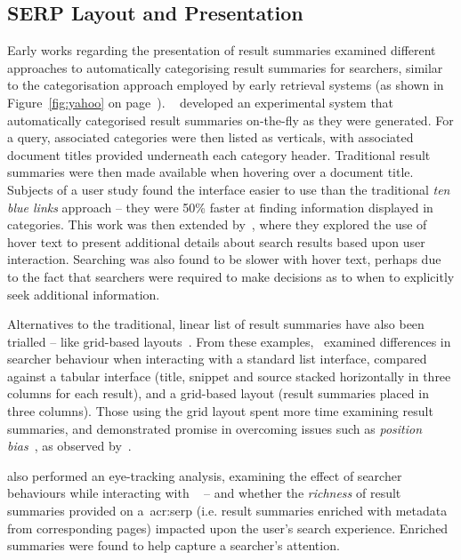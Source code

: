 \subsection{SERP Layout and Presentation}
Early works regarding the presentation of result summaries examined different approaches to automatically categorising result summaries for searchers, similar to the categorisation approach employed by early retrieval systems (as shown in Figure~\ref{fig:yahoo} on page~\pageref{fig:yahoo}). ~\cite{chen2000order_to_web} developed an experimental system that automatically categorised result summaries on-the-fly as they were generated. For a query, associated categories were then listed as verticals, with associated document titles provided underneath each category header. Traditional result summaries were then made available when hovering over a document title. Subjects of a user study found the interface easier to use than the traditional \emph{ten blue links} approach -- they were 50\% faster at finding information displayed in categories. This work was then extended by~\cite{dumais2001results_in_context}, where they explored the use of hover text to present additional details about search results based upon user interaction. Searching was also found to be slower with hover text, perhaps due to the fact that searchers were required to make decisions as to when to explicitly seek additional information.

Alternatives to the traditional, linear list of result summaries have also been trialled -- like grid-based layouts~\citep{resnick2001modeling, kammerer2010interface, chierichetti2011two_dimensional_presentation}. From these examples,~\cite{kammerer2010interface} examined differences in searcher behaviour when interacting with a standard list interface, compared against a tabular interface (title, snippet and source stacked horizontally in three columns for each result), and a grid-based layout (result summaries placed in three columns). Those using the grid layout spent more time examining result summaries, and demonstrated promise in overcoming issues such as \emph{position bias}~\citep{craswell2008click_models}, as observed by~\cite{joachims2005click_model}.

\cite{marcos2015snippets_web_search} also performed an eye-tracking analysis, examining the effect of searcher behaviours while interacting with ~ -- and whether the \emph{richness} of result summaries provided on a~\gls{acr:serp} (i.e. result summaries enriched with metadata from corresponding pages) impacted upon the user's search experience. Enriched summaries were found to help capture a searcher's attention. 

